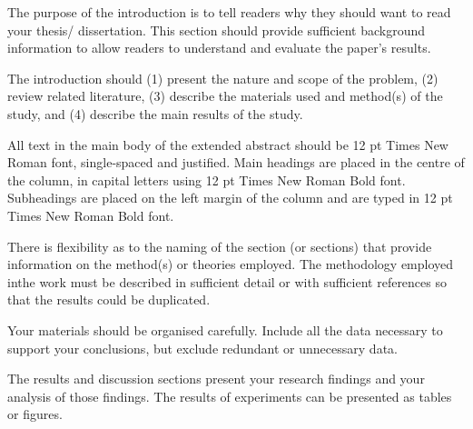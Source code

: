 \StartExtendedAbstract



The purpose of the introduction is to tell readers why they should want to read your thesis/ dissertation. This section should provide sufficient background information to allow readers to understand and evaluate the paper's results.

The introduction should (1) present the nature and scope of the problem, (2) review related literature, (3) describe the materials used and method(s) of the study, and (4) describe the main results of the study.

All text in the main body of the extended abstract should be 12 pt Times New Roman font, single-spaced and justified. Main headings are placed in the centre of the column, in capital letters using 12 pt Times New Roman Bold font. Subheadings are placed on the left margin of the column and are typed in 12 pt Times New Roman Bold font.


There is flexibility as to the naming of the section (or sections) that provide information on the method(s) or theories employed. The methodology employed inthe work must be described in sufficient detail or with sufficient references so that the results could be duplicated.

Your materials should be organised carefully. Include all the data necessary to support your conclusions, but exclude redundant or unnecessary data.


The results and discussion sections present your research findings and your analysis of those findings. The results of experiments can be presented as tables or figures.

